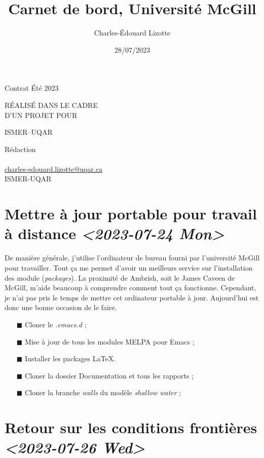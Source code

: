 \documentclass[10pt]{article}
\author{Charles-Édouard Lizotte}
\date{28/07/2023}
\title{Carnet de bord, Université McGill}
\makeatletter
\numberwithin{equation}{section}
\renewcommand{\boxtimes}{\blacksquare}
\newcommand{\mytitlepage}{
\begin{titlepage}
\begin{center}
{\Large Contrat Été 2023 \par}
\vspace{2cm}
{\Large \MakeUppercase{\thetitle} \par}
\vspace{2cm}
RÉALISÉ DANS LE CADRE\\ D'UN PROJET POUR \par
\vspace{2cm}
{\Large ISMER--UQAR \par}
\vspace{2cm}
{\thedate}
\end{center}
\vfill
Rédaction \\
{\theauthor}\\
\url{charles-edouard.lizotte@uqar.ca}\\
ISMER-UQAR
\end{titlepage}
}
\makeatother
\begin{document}
\mytitlepage
\tableofcontents\newpage



\section{Mettre à jour portable pour travail à distance  \textit{<2023-07-24 Mon>}}
\label{sec:org635ec8d}

De manière générale, j'utilise l'ordinateur de bureau fourni par l'université McGill pour travailler.
Tout ça me permet d'avoir un meilleurs service sur l'installation des module (\emph{packages}).
La proximité de Ambrish, soit le James Caveen de McGill, m'aide beaucoup à comprendre comment tout ça fonctionne.
Cependant, je n'ai pas pris le temps de mettre cet ordinateur portable à jour.
Aujourd'hui est donc une bonne occasion de le faire.
\begin{itemize}
\item[{$\boxtimes$}] Cloner le \emph{.emacs.d} ;
\item[{$\boxtimes$}] Mise à jour de tous les modules MELPA pour Emacs ;
\item[{$\boxtimes$}] Installer les packages \LaTeX{}.
\item[{$\boxtimes$}] Cloner la dossier Documentation et tous les rapports ;
\item[{$\boxtimes$}] Cloner la branche \emph{walls} du modèle \emph{shallow water} ;
\end{itemize}


\section{Retour sur les conditions frontières \textit{<2023-07-26 Wed>}}
\label{sec:org4f35fde}
\end{document}
